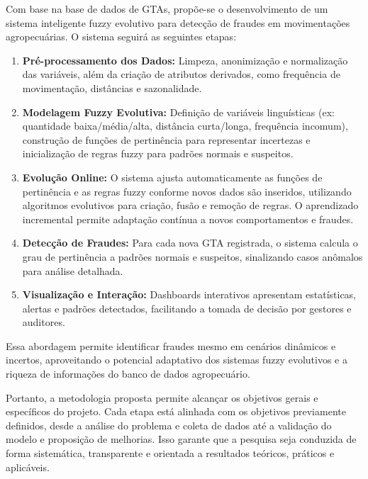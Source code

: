 Com base na base de dados de GTAs, propõe-se o desenvolvimento de um sistema inteligente fuzzy evolutivo para detecção de fraudes em movimentações agropecuárias. O sistema seguirá as seguintes etapas:
\begin{enumerate}
    \item \textbf{Pré-processamento dos Dados:} Limpeza, anonimização e normalização das variáveis, além da criação de atributos derivados, como frequência de movimentação, distâncias e sazonalidade.
    \item \textbf{Modelagem Fuzzy Evolutiva:} Definição de variáveis linguísticas (ex: quantidade baixa/média/alta, distância curta/longa, frequência incomum), construção de funções de pertinência para representar incertezas e inicialização de regras fuzzy para padrões normais e suspeitos.
    \item \textbf{Evolução Online:} O sistema ajusta automaticamente as funções de pertinência e as regras fuzzy conforme novos dados são inseridos, utilizando algoritmos evolutivos para criação, fusão e remoção de regras. O aprendizado incremental permite adaptação contínua a novos comportamentos e fraudes.
    \item \textbf{Detecção de Fraudes:} Para cada nova GTA registrada, o sistema calcula o grau de pertinência a padrões normais e suspeitos, sinalizando casos anômalos para análise detalhada.
    \item \textbf{Visualização e Interação:} Dashboards interativos apresentam estatísticas, alertas e padrões detectados, facilitando a tomada de decisão por gestores e auditores.
\end{enumerate}

Essa abordagem permite identificar fraudes mesmo em cenários dinâmicos e incertos, aproveitando o potencial adaptativo dos sistemas fuzzy evolutivos e a riqueza de informações do banco de dados agropecuário.

Portanto, a metodologia proposta permite alcançar os objetivos gerais e específicos do projeto. Cada etapa está alinhada com os objetivos previamente definidos, desde a análise do problema e coleta de dados até a validação do modelo e proposição de melhorias. Isso garante que a pesquisa seja conduzida de forma sistemática, transparente e orientada a resultados teóricos, práticos e aplicáveis.
